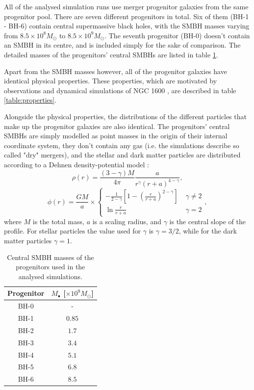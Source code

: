 \documentclass[english, oneside]{HYgradu}
\begin{document}
All of the analysed simulation runs use merger progenitor galaxies from the same progenitor pool. There are seven different progenitors in total. Six of them (BH-1 - BH-6) contain central supermassive black holes, with the SMBH masses varying from $8.5 \times 10^8 M_\odot$ to $8.5 \times 10^9 M_\odot$. The seventh progenitor (BH-0) doesn't contain an SMBH in its centre, and is included simply for the sake of comparison. The detailed masses of the progenitors' central SMBHs are listed in table \ref{table:progenitors}. 

Apart from the SMBH masses however, all of the progenitor galaxies have identical physical properties. These properties, which are motivated by observations and dynamical simulations of NGC 1600 \citep{Rantala2018}, are described in table \ref{table:properties}.

Alongside the physical properties, the distributions of the different particles that make up the progenitor galaxies are also identical. The progenitors' central SMBHs are simply modelled as point masses in the origin of their internal coordinate system, they don't contain any gas (i.e. the simulations describe so called "dry" mergers), and the stellar and dark matter particles are distributed according to a Dehnen density-potential model \citep{Dehnen1993}:
\begin{equation}
\rho(r) = \frac{(3-\gamma)M}{4\pi} \frac{a}{r^\gamma (r+a)^{4-\gamma}},
\end{equation}
\begin{equation}
\phi(r) = \frac{GM}{a} \times 
\begin{cases}
	-\frac{1}{2-\gamma} \left[ 1 - \left( \frac{r}{r+a} \right)^{2-\gamma} \right] & \; \gamma \neq 2 \\
	\ln \frac{r}{r+a}	 & \; \gamma = 2
\end{cases},
\end{equation}
where $M$ is the total mass, $a$ is a scaling radius, and $\gamma$ is the central slope of the profile. For stellar particles the value used for $\gamma$  is $\gamma = 3/2$, while for the dark matter particles $\gamma = 1$.

\begin{table}
	\begin{center}
		\begin{tabular}{c c}
		\hline
		\hline
		Progenitor & $M_\bullet$ [$\times 10^9 M_\odot$] \\
		\hline
		BH-0 & - \\
		BH-1 & $0.85$ \\
		BH-2 & $1.7$ \\
		BH-3 & $3.4$ \\
		BH-4 & $5.1$ \\
		BH-5 & $6.8$ \\
		BH-6 & $8.5$ \\
		\hline
		\end{tabular}
	\end{center}
	\caption{Central SMBH masses of the progenitors used in the analysed simulations.}
	\label{table:progenitors}
\end{table}
\end{document}
